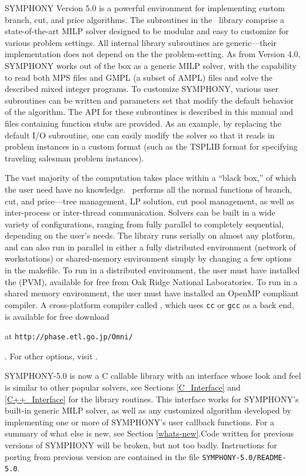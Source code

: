 SYMPHONY Version 5.0 is a powerful environment for implementing custom branch,
cut, and price algorithms. The subroutines in the \BB\ library comprise a
state-of-the-art MILP solver designed to be modular and easy to customize for
various problem settings. All internal library subroutines are generic---their
implementation does not depend on the the problem-setting. As from Version 4.0,
SYMPHONY works out of the box as a generic MILP solver, with the capability to
read both MPS files and GMPL (a subset of AMPL) files and solve the described
mixed integer programs. To customize SYMPHONY, various user subroutines can be
written and parameters set that modify the default behavior of the
algorithm. The API for these subroutines is described in this manual and files
containing function stubs are provided. As an example, by replacing the
default I/O subroutine, one can easily modify the solver so that it reads in
problem instances in a custom format (such as the TSPLIB format for specifying
traveling salesman problem instances).

The vast majority of the computation takes place within a ``black box,'' of
which the user need have no knowledge. \BB\ performs all the normal functions
of branch, cut, and price---tree management, LP solution, cut pool management,
as well as inter-process or inter-thread communication. Solvers can be built
in a wide variety of configurations, ranging from fully parallel to completely
sequential, depending on the user's needs. The library runs serially on almost
any platform, and can also run in parallel in either a fully distributed
environment (network of workstations) or shared-memory environment simply by
changing a few options in the makefile. To run in a distributed environment,
the user must have installed the {\em
{}}
(PVM), available for free from Oak Ridge National Laboratories.
To run in a shared memory environment, the user must have installed an
OpenMP compliant compiler. A cross-platform compiler called {\em
{}}, which uses 
{\tt cc} or {\tt gcc} as a back end, is available for free download
\begin{latexonly}
at {\tt http://phase.etl.go.jp/Omni/}
\end{latexonly}. For other options, visit
\texttt{}.

SYMPHONY-5.0 is now a C callable library with an interface whose look and
feel is similar to other popular solvers, see Sections \ref{C_Interface} and
\ref{C++_Interface} for the library routines. This interface works for
SYMPHONY's built-in generic MILP solver, as well as any customized algorithm 
developed by implementing one or more of SYMPHONY's user callback functions. 
For a summary of what else is new, see Section \ref{whats-new}.Code written for
previous versions of SYMPHONY will be broken, but not too badly. Instructions
for porting from previous version are contained in the file
\texttt{SYMPHONY-5.0/README-5.0}.

